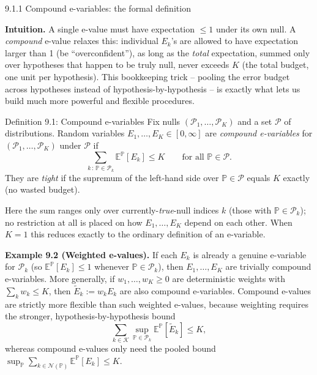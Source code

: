 \documentclass[aspectratio=169,10pt]{beamer}
\newcommand{\Kc}{\mathcal{K}}
\newcommand{\Nc}{\mathcal{N}}
\begin{document}
\begin{frame}[allowframebreaks]{9.1.1 Compound e-variables: the formal definition}

\textbf{Intuition.} A single e-value must have expectation $\le 1$ under its own null. A \emph{compound} e-value relaxes this: individual $E_k$'s are allowed to have expectation larger than 1 (be ``overconfident''), as long as the \emph{total} expectation, summed only over hypotheses that happen to be truly null, never exceeds $K$ (the total budget, one unit per hypothesis). This bookkeeping trick -- pooling the error budget across hypotheses instead of hypothesis-by-hypothesis -- is exactly what lets us build much more powerful and flexible procedures.

\begin{block}{Definition 9.1: Compound e-variables}
Fix nulls $(\mathcal{P}_1,\dots,\mathcal{P}_K)$ and a set $\mathcal{P}$ of distributions. Random variables $E_1,\dots,E_K \in [0,\infty]$ are \emph{compound e-variables} for $(\mathcal{P}_1,\dots,\mathcal{P}_K)$ under $\mathcal{P}$ if
\[
\sum_{k \,:\, \mathbb{P} \in \mathcal{P}_k} \mathbb{E}^{\mathbb{P}}[E_k] \le K \qquad \text{for all } \mathbb{P} \in \mathcal{P}.
\]
They are \emph{tight} if the supremum of the left-hand side over $\mathbb{P} \in \mathcal{P}$ equals $K$ exactly (no wasted budget).
\end{block}
Here the sum ranges only over currently-\emph{true}-null indices $k$ (those with $\mathbb{P} \in \mathcal{P}_k$); no restriction at all is placed on how $E_1,\dots,E_K$ depend on each other. When $K=1$ this reduces exactly to the ordinary definition of an e-variable.

\framebreak

\textbf{Example 9.2 (Weighted e-values).} If each $E_k$ is already a genuine e-variable for $\mathcal{P}_k$ (so $\mathbb{E}^{\mathbb{P}}[E_k]\le 1$ whenever $\mathbb{P}\in\mathcal{P}_k$), then $E_1,\dots,E_K$ are trivially compound e-variables. More generally, if $w_1,\dots,w_K \ge 0$ are deterministic weights with $\sum_k w_k \le K$, then $\tilde{E}_k := w_k E_k$ are also compound e-variables. Compound e-values are strictly more flexible than such weighted e-values, because weighting requires the stronger, hypothesis-by-hypothesis bound
\[
\sum_{k \in \Kc} \sup_{\mathbb{P}\in\mathcal{P}_k} \mathbb{E}^{\mathbb{P}}[\tilde{E}_k] \le K,
\]
whereas compound e-values only need the pooled bound $\sup_{\mathbb{P}} \sum_{k \in \Nc(\mathbb{P})} \mathbb{E}^{\mathbb{P}}[E_k] \le K$.

\framebreak


\end{frame}
\end{document}
